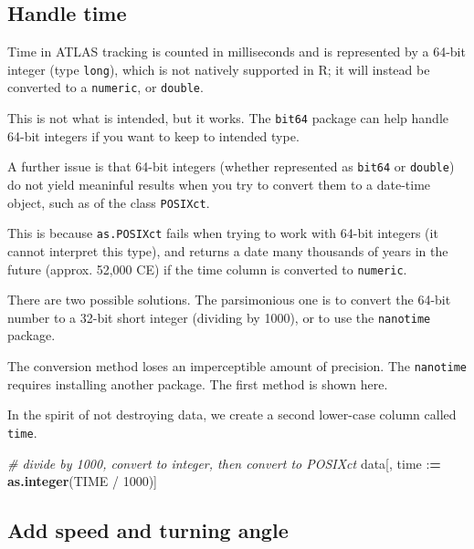 \documentclass[
]{scrreprt}
\newenvironment{Shaded}{}{}
\newcommand{\CommentTok}[1]{\textcolor[rgb]{0.38,0.63,0.69}{\textit{#1}}}
\newcommand{\DecValTok}[1]{\textcolor[rgb]{0.25,0.63,0.44}{#1}}
\newcommand{\ErrorTok}[1]{\textcolor[rgb]{1.00,0.00,0.00}{\textbf{#1}}}
\newcommand{\KeywordTok}[1]{\textcolor[rgb]{0.00,0.44,0.13}{\textbf{#1}}}
\newcommand{\NormalTok}[1]{#1}
\newcommand{\OperatorTok}[1]{\textcolor[rgb]{0.40,0.40,0.40}{#1}}
\newcommand{\StringTok}[1]{\textcolor[rgb]{0.25,0.44,0.63}{#1}}
\begin{document}
\hypertarget{handle-time}{%
\subsection{Handle time}\label{handle-time}}

Time in ATLAS tracking is counted in milliseconds and is represented by a 64-bit integer (type \texttt{long}), which is not natively supported in R; it will instead be converted to a \texttt{numeric}, or \texttt{double}.

This is not what is intended, but it works. The \texttt{bit64} package can help handle 64-bit integers if you want to keep to intended type.

A further issue is that 64-bit integers (whether represented as \texttt{bit64} or \texttt{double}) do not yield meaninful results when you try to convert them to a date-time object, such as of the class \texttt{POSIXct}.

This is because \texttt{as.POSIXct} fails when trying to work with 64-bit integers (it cannot interpret this type), and returns a date many thousands of years in the future (approx. 52,000 CE) if the time column is converted to \texttt{numeric}.

There are two possible solutions. The parsimonious one is to convert the 64-bit number to a 32-bit short integer (dividing by 1000), or to use the \texttt{nanotime} package.

The conversion method loses an imperceptible amount of precision. The \texttt{nanotime} requires installing another package. The first method is shown here.

In the spirit of not destroying data, we create a second lower-case column called \texttt{time}.

\begin{Shaded}
\begin{Highlighting}[]
\CommentTok{\# divide by 1000, convert to integer, then convert to POSIXct}
\NormalTok{data[, time }\OperatorTok{:}\ErrorTok{=}\StringTok{ }\KeywordTok{as.integer}\NormalTok{(TIME }\OperatorTok{/}\StringTok{ }\DecValTok{1000}\NormalTok{)]}
\end{Highlighting}
\end{Shaded}

\hypertarget{add-speed-and-turning-angle}{%
\subsection{Add speed and turning angle}\label{add-speed-and-turning-angle}}
\end{document}
